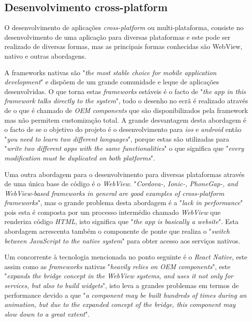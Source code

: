 \subsection{Desenvolvimento cross-platform}
O desenvolvimento de aplicações \textit{cross-platform} ou multi-plataforma, consiste no desenvolvimento de uma aplicação para diversas plataformas e este pode ser realizado de diversas formas, mas as principais formas conhecidas são WebView, nativo e outras abordagens.

A frameworks nativas são "\emph{the most stable choice for mobile application development}"\citep{flutter} e dispõem de um grande comunidade e leque de aplicações desenvolvidas. O que torna estas \textit{frameworks} estáveis é o facto de "\emph{the app in this framework talks directly to the system}"\citep{flutter}, todo o desenho no ecrã é realizado através de o que é chamado de \emph{OEM components} que são disponibilizados pela framework mas não permitem customização total. A grande desvantagem desta abordagem é o facto de se o objetivo do projeto é o desenvolvimento para \textit{ios} e \textit{android} então "\emph{you need to learn two different languages}"\citep{flutter}, porque estas são utilizadas para "\emph{write two different apps with the same functionalities}"\citep{flutter} o que significa que "\emph{every modification must be duplicated on both platforms}"\citep{flutter}.

Uma outra abordagem para o desenvolvimento para diversas plataformas através de uma única base de código é o \textit{WebView}. "\emph{Cordova-, Ionic-, PhoneGap-, and WebView-based frameworks in general are good examples of cross-platform frameworks}"\citep{flutter}, mas o grande problema desta abordagem é a "\emph{lack in performance}"\citep{flutter} pois esta é composta por um processo intermédio chamado \textit{WebView} que renderiza código \textit{HTML}, isto significa que "\emph{the app is basically a website}"\citep{flutter}.
Esta abordagem acrescenta também o componente de ponte que realiza o "\emph{switch between JavaScript to the native system}"\citep{flutter} para obter acesso aos serviços nativos.

Um concorrente à tecnologia mencionada no ponto seguinte é o \textit{React Native}, este assim como as \textit{frameworks} nativas "\emph{heavily relies on OEM components}"\citep{flutter}, este "\emph{expands the bridge concept in the WebView systems, and uses it not only for services, but also to build widgets}"\citep{flutter}, isto leva a grandes problemas em termos de performance devido a que "\emph{a component may be built hundreds of times during an animation, but due to the expanded concept of the bridge, this component may slow down to a great extent}"\citep{flutter}.